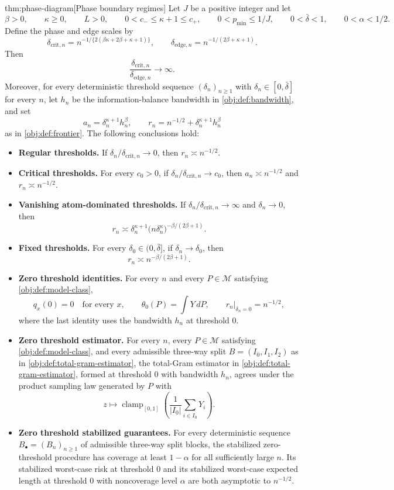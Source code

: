 \documentclass[11pt]{article}
\begin{document}
\begin{theoremv}{thm:phase-diagram}[Phase boundary regimes]
Let \(J\) be a positive integer and let
\[
\beta>0,\qquad
\kappa\geq 0,\qquad
L>0,\qquad
0<c_-\leq \kappa+1\leq c_+,\qquad
0<p_{\min}\leq 1/J,\qquad
0<\bar\delta<1,\qquad
0<\alpha<1/2 .
\]
Define the phase and edge scales by
\[
\delta_{\mathrm{crit},n}
=
n^{-1/\{2(\beta\kappa+2\beta+\kappa+1)\}},
\qquad
\delta_{\mathrm{edge},n}
=
n^{-1/(2\beta+\kappa+1)} .
\]
Then
\[
\frac{\delta_{\mathrm{crit},n}}{\delta_{\mathrm{edge},n}}\to\infty .
\]
Moreover, for every deterministic threshold sequence \((\delta_n)_{n\geq 1}\) with \(\delta_n\in[0,\bar\delta]\) for every \(n\), let \(h_n\) be the information-balance bandwidth in \cref{obj:def:bandwidth}, and set
\[
a_n=\delta_n^{\kappa+1}h_n^\beta,
\qquad
r_n=n^{-1/2}+\delta_n^{\kappa+1}h_n^\beta
\]
as in \cref{obj:def:frontier}. The following conclusions hold:
\begin{itemize}
\item \textbf{Regular thresholds.} If \(\delta_n/\delta_{\mathrm{crit},n}\to 0\), then \(r_n\asymp n^{-1/2}\).
\item \textbf{Critical thresholds.} For every \(c_0>0\), if \(\delta_n/\delta_{\mathrm{crit},n}\to c_0\), then \(a_n\asymp n^{-1/2}\) and \(r_n\asymp n^{-1/2}\).
\item \textbf{Vanishing atom-dominated thresholds.} If \(\delta_n/\delta_{\mathrm{crit},n}\to\infty\) and \(\delta_n\to0\), then
\[
r_n\asymp
\delta_n^{\kappa+1}\bigl(n\delta_n^\kappa\bigr)^{-\beta/(2\beta+1)} .
\]
\item \textbf{Fixed thresholds.} For every \(\delta_0\in(0,\bar\delta]\), if \(\delta_n\to\delta_0\), then
\[
r_n\asymp n^{-\beta/(2\beta+1)} .
\]
\item \textbf{Zero threshold identities.} For every \(n\) and every \(P\in\mathcal M\) satisfying \cref{obj:def:model-class},
\[
q_x(0)=0\quad\text{for every }x,\qquad
\theta_0(P)=\int Y\,dP,\qquad
r_n\big|_{\delta_n=0}=n^{-1/2},
\]
where the last identity uses the bandwidth \(h_n\) at threshold \(0\).
\item \textbf{Zero threshold estimator.} For every \(n\), every \(P\in\mathcal M\) satisfying \cref{obj:def:model-class}, and every admissible three-way split \(B=(I_0,I_1,I_2)\) as in \cref{obj:def:total-gram-estimator}, the total-Gram estimator in \cref{obj:def:total-gram-estimator}, formed at threshold \(0\) with bandwidth \(h_n\), agrees under the product sampling law generated by \(P\) with
\[
z\mapsto
\operatorname{clamp}_{[0,1]}\!\left(\frac{1}{|I_0|}\sum_{i\in I_0}Y_i\right).
\]
\item \textbf{Zero threshold stabilized guarantees.} For every deterministic sequence \(B_\bullet=(B_n)_{n\geq1}\) of admissible three-way split blocks, the stabilized zero-threshold procedure has coverage at least \(1-\alpha\) for all sufficiently large \(n\). Its stabilized worst-case risk at threshold \(0\) and its stabilized worst-case expected length at threshold \(0\) with noncoverage level \(\alpha\) are both asymptotic to \(n^{-1/2}\).
\end{itemize}
\end{theoremv}
\end{document}
